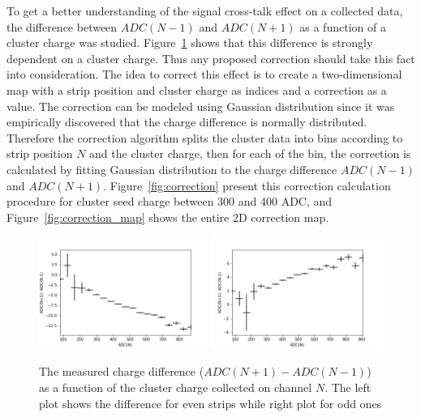 To get a better understanding of the signal cross-talk effect on a collected data, the difference between $ADC(N-1)$ and $ADC(N+1)$ as a function of a cluster charge was studied. Figure~\ref{fig:difference_odd_even} shows that this difference is strongly dependent on a cluster charge. Thus any proposed correction should take this fact into consideration.  The idea to correct this effect is to create a two-dimensional map with a strip position and cluster charge as indices and a correction as a value. The correction can be modeled using Gaussian distribution since it was empirically discovered that the charge difference is normally distributed.
Therefore the correction algorithm splits the cluster data into bins according to strip position $N$ and the cluster charge, then for each of the bin, the correction is calculated by fitting Gaussian distribution to the charge difference  $ADC(N-1)$ and $ADC(N+1)$. 
Figure~\ref{fig:correction} present this correction calculation procedure for cluster seed charge between 300 and 400 ADC, and Figure~\ref{fig:correction_map} shows the entire 2D correction map. 

\begin{figure}[htb]
\begin{center}
\includegraphics[width=0.49\textwidth]{figures/eta/difference_vs_charge_even.png} 
\includegraphics[width=0.49\textwidth]{figures/eta/difference_vs_charge_odd.png}
\caption{The measured charge difference ($ADC(N+1) - ADC(N-1)$) as a function of the cluster charge collected on channel $N$. The left plot shows the difference for even strips while right plot for odd ones }
\label{fig:difference_odd_even}
 \end{center}
 \end{figure}

